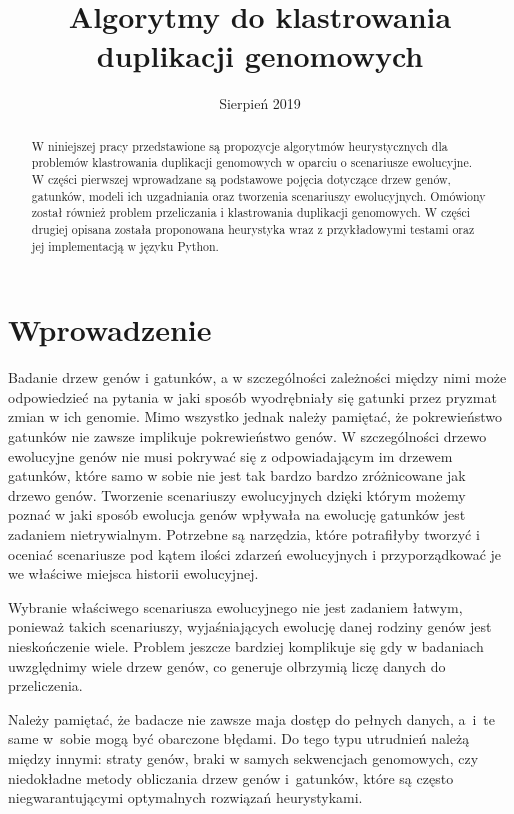 \documentclass[licencjacka]{pracamgr}
\title{Algorytmy do klastrowania duplikacji genomowych}
\date{Sierpień 2019}
\begin{document}
\maketitle


\begin{abstract}
   W niniejszej pracy przedstawione są propozycje algorytmów heurystycznych dla problemów klastrowania duplikacji genomowych w oparciu o scenariusze ewolucyjne. W części pierwszej wprowadzane są podstawowe pojęcia dotyczące drzew genów, gatunków, modeli ich uzgadniania oraz tworzenia scenariuszy ewolucyjnych. Omówiony został również problem przeliczania i klastrowania duplikacji genomowych. W części drugiej opisana została proponowana heurystyka wraz z przykładowymi testami oraz jej implementacją w języku Python.
\end{abstract}


\renewcommand{\contentsname}{Spis Treści}
\tableofcontents

\chapter*{Wprowadzenie}


Badanie drzew genów i gatunków, a w szczególności zależności między nimi może odpowiedzieć na pytania w jaki sposób wyodrębniały się gatunki przez pryzmat zmian w ich genomie. Mimo wszystko jednak należy pamiętać, że pokrewieństwo gatunków nie zawsze implikuje pokrewieństwo genów. W szczególności drzewo ewolucyjne genów nie musi pokrywać się z odpowiadającym im drzewem gatunków, które samo w sobie nie jest tak bardzo bardzo zróżnicowane jak drzewo genów. Tworzenie scenariuszy ewolucyjnych dzięki którym możemy poznać w jaki sposób ewolucja genów wpływała na ewolucję gatunków jest zadaniem nietrywialnym. Potrzebne są narzędzia, które potrafiłyby tworzyć i oceniać scenariusze pod kątem ilości zdarzeń ewolucyjnych i przyporządkować je we właściwe miejsca historii ewolucyjnej.

Wybranie właściwego scenariusza ewolucyjnego nie jest zadaniem łatwym, ponieważ takich scenariuszy, wyjaśniających ewolucję danej rodziny genów jest nieskończenie wiele. Problem jeszcze bardziej komplikuje się gdy w badaniach uwzględnimy wiele drzew genów, co generuje olbrzymią liczę danych do przeliczenia.

Należy pamiętać, że badacze nie zawsze maja dostęp do pełnych danych, a~i~te same w~sobie mogą być obarczone błędami. Do tego typu utrudnień należą między innymi: straty genów, braki w samych sekwencjach genomowych, czy niedokładne metody obliczania drzew genów i~gatunków, które są często niegwarantującymi optymalnych rozwiązań heurystykami. 
\end{document}
